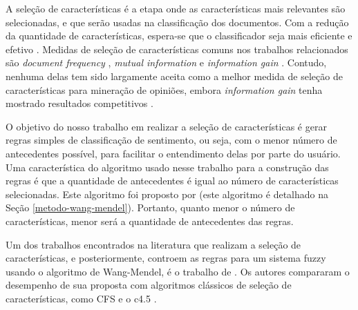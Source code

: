 \documentclass[template.tex]{subfiles}
\begin{document}

A seleção de características é a etapa onde as características mais relevantes são selecionadas, e que serão usadas na classificação dos documentos. Com a redução da quantidade de características, espera-se que o classificador seja mais eficiente e efetivo \cite{moraes2012document}. Medidas de seleção de características comuns nos trabalhos relacionados são \textit{document frequency} \cite{pang2002thumbs}, \textit{mutual information} \cite{turney2002thumbs} e \textit{information gain} \cite{wiebe2006word}. Contudo, nenhuma delas tem sido largamente aceita como a melhor medida de seleção de características para mineração de opiniões, embora \textit{information gain} tenha mostrado resultados competitivos \cite{moraes2012document}.

O objetivo do nosso trabalho em realizar a seleção de características é gerar regras simples de classificação de sentimento, ou seja, com o menor número de antecedentes possível, para facilitar o entendimento delas por parte do usuário. Uma característica do algoritmo usado nesse trabalho para a construção das regras é que a quantidade de antecedentes é igual ao número de características selecionadas. Este algoritmo foi proposto por  (este algoritmo é detalhado na Seção \ref{metodo-wang-mendel}). Portanto, quanto menor o número de características, menor será a quantidade de antecedentes das regras.

Um dos trabalhos encontrados na literatura que realizam a seleção de características, e posteriormente, controem as regras para um sistema fuzzy usando o algoritmo de Wang-Mendel, é o trabalho de . Os autores compararam o desempenho de sua proposta com algoritmos clássicos de seleção de características, como CFS \cite{hall1999correlation} e o c4.5 \cite{quinlan2014c4}. 
\end{document}
